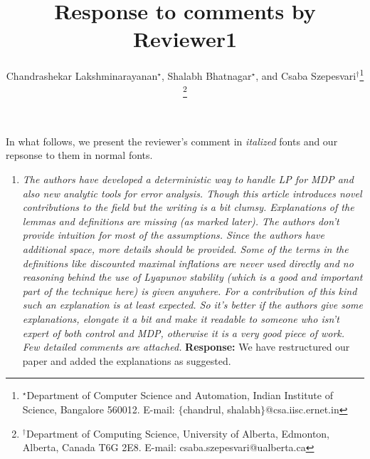 \documentclass[12pt,draftcls,onecolumn]{IEEEtran}
\title{ Response to comments by Reviewer1}
\author{Chandrashekar Lakshminarayanan$^\star$, Shalabh Bhatnagar$^\star$,
 and Csaba Szepesvari$^\dagger$\thanks{$^\star$Department of Computer
Science and Automation, Indian Institute of Science, Bangalore 560012.
E-mail: $\{$chandrul, shalabh$\}$@csa.iisc.ernet.in}
\thanks{$^\dagger$Department of Computing Science, University of Alberta,
Edmonton, Alberta, Canada T6G 2E8. E-mail: csaba.szepesvari@ualberta.ca}}
\begin{document}
\maketitle
In what follows, we present the reviewer's comment in \emph{italized} fonts and our repsonse to them in normal fonts.
\begin{enumerate}
\item \emph{
The authors have developed a deterministic way to handle LP for MDP and
also new analytic tools for error analysis. Though this article
introduces novel contributions to the field but the writing is a bit
clumsy. Explanations of the lemmas and definitions are missing (as
marked later). The authors don't provide intuition for most of the
assumptions. Since the authors have additional space, more details
should be provided.
Some of the terms in the definitions like discounted maximal inflations
are never used directly and no reasoning behind the use of Lyapunov
stability (which is a good and important part of the technique here) is
given anywhere. For a contribution of this kind such an explanation is
at least expected. So it's better if the authors give some
explanations, elongate it a bit and make it readable to someone who
isn't expert of both control and MDP, otherwise it is a very good piece
of work.
Few detailed comments are attached.
}
\textbf{Response:} We have restructured our paper and added the explanations as suggested.
\end{enumerate}

%
\end{document}
